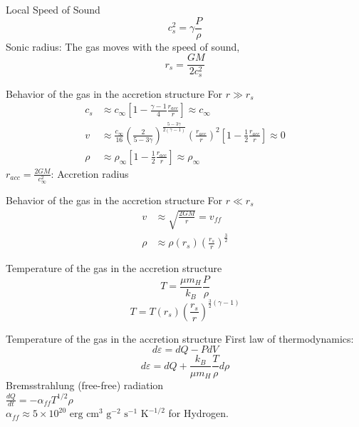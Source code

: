\documentclass{beamer}
\begin{document}
\begin{darkframes}
\begin{frame}{Local Speed of Sound}
	\[ c_s ^2 = \gamma \frac{P}{\rho} \]	 
	\pause
	Sonic radius: The gas moves with the speed of sound,
	\[ r_s = \frac{GM}{2c_s^2}\]   
\end{frame}

\begin{frame}{Behavior of the gas in the accretion structure}
	For $r \gg r_s$
	\pause
	\begin{align*}
	c_s & \approx c_\infty \left[ 1- \frac{\gamma -1}{4} \frac{r_{acc}}{r}\right] \approx c_\infty\\
	v & \approx \frac{c_\infty}{16} \left( \frac{2}{5-3\gamma}\right)^{\frac{5-3\gamma}{2(\gamma-1)}}
	\left( \frac{r_{acc}}{r}\right)^2 \left[ 1- \frac{1}{2} \frac{r_{acc}}{r} \right] \approx 0\\
	\rho & \approx \rho_\infty \left[ 1- \frac{1}{2} \frac{r_{acc}}{r} \right] \approx \rho_\infty
	 \end{align*}
	 \pause	 
	$r_{acc} = \frac{2GM}{c_\infty^2} $: Accretion radius 
\end{frame}

\begin{frame}{Behavior of the gas in the accretion structure}
	For $r \ll r_s$
	\pause
	\begin{align*}
	v & \approx \sqrt{\frac{2GM}{r}} = v_{ff} \\
	\rho & \approx \rho (r_s) \left( \frac{r_s}{r}\right)^\frac{3}{2}
	 \end{align*}
\end{frame}

\begin{frame}{Temperature of the gas in the accretion structure}
	\[ T = 	\frac{\mu m_H}{k_B} \frac{P}{\rho} \]
	\pause
	\[ T = T(r_s) \left( \frac{r_s}{r}\right)^{\frac{3}{2}(\gamma - 1)} \]
\end{frame}

\begin{frame}{Temperature of the gas in the accretion structure}
	First law of thermodynamics:
	\[ d\varepsilon = dQ - PdV\]
	\pause
	\[ d\varepsilon = dQ + \frac{k_B}{\mu m_H} \frac{T}{\rho} d\rho\]	
	\pause
	Bremsstrahlung (free-free) radiation\\
	\pause
	$\frac{dQ}{dt} = -\alpha_{ff} T^{1/2} \rho$\\
	\pause
	$\alpha_{ff} \approx 5 \times 10^{20} \textrm{ erg} \textrm{ cm}^3 \textrm{ g}^{-2} \textrm{ s}^{-1} \textrm{ K}^{-1/2}$ for Hydrogen.	
\end{frame}


\end{darkframes}
\end{document}
